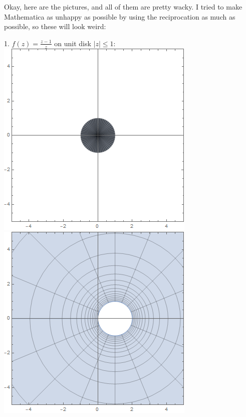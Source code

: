 Okay, here are the pictures, and all of them are pretty wacky.  I tried to make Mathematica as unhappy as possible by using the reciprocation as much as possible, so these will look weird:
\begin{center}
  1. $f(z) = \frac{z-1}{z}$ on unit disk $|z| \leq 1$: \\
  \includegraphics[scale=0.3]{images/mobius1dom.png}
  \includegraphics[scale=0.3]{images/mobius1ran.png}
\end{center}
